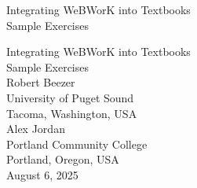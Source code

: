 \documentclass[oneside,10pt,]{book}
\newcommand{\titlepagefont}{\relax}
\numberwithin{equation}{section}
\begin{document}
\raggedbottom
\frontmatter
\thispagestyle{empty}
{\titlepagefont\centering
\vspace*{0.28\textheight}
{\Huge Integrating WeBWorK into Textbooks}\\[2\baselineskip]
{\LARGE Sample Exercises}\\
}
\clearpage
\thispagestyle{empty}
{\titlepagefont\centering
\vspace*{0.14\textheight}
{\Huge Integrating WeBWorK into Textbooks}\\[\baselineskip]
{\LARGE Sample Exercises}\\[3\baselineskip]
{\Large Robert Beezer}\\[0.5\baselineskip]
{\Large University of Puget Sound\\
Tacoma, Washington, USA}\\[3\baselineskip]
{\Large Alex Jordan}\\[0.5\baselineskip]
{\Large Portland Community College\\
Portland, Oregon, USA}\\[3\baselineskip]
{\Large August 6, 2025}\\}
\clearpage
\thispagestyle{empty}
\null\clearpage
%
%
\typeout{************************************************}
\typeout{************************************************}
%
\end{document}
